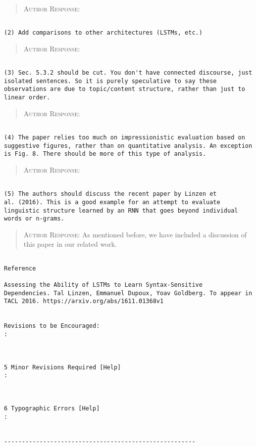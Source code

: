 \begin{quote}
\textsc{Author Response:}  
\end{quote}
\begin{verbatim}

(2) Add comparisons to other architectures (LSTMs, etc.)
\end{verbatim}  
\begin{quote}
\textsc{Author Response:}  
\end{quote}
\begin{verbatim}

(3) Sec. 5.3.2 should be cut. You don't have connected discourse, just
isolated sentences. So it is purely speculative to say these
observations are due to topic/content structure, rather than just to
linear order.
\end{verbatim}  
\begin{quote}
\textsc{Author Response:}  
\end{quote}
\begin{verbatim}

(4) The paper relies too much on impressionistic evaluation based on
suggestive figures, rather than on quantitative analysis. An exception
is Fig. 8. There should be more of this type of analysis.
\end{verbatim}  
\begin{quote}
\textsc{Author Response:}  
\end{quote}
\begin{verbatim}

(5) The authors should discuss the recent paper by Linzen et
al. (2016). This is a good example for an attempt to evaluate
linguistic structure learned by an RNN that goes beyond individual
words or n-grams.
\end{verbatim}  
\begin{quote}
\textsc{Author Response:}  As mentioned before, we have included a discussion of
this paper in our related work.
\end{quote}
\begin{verbatim}

Reference

Assessing the Ability of LSTMs to Learn Syntax-Sensitive
Dependencies. Tal Linzen, Emmanuel Dupoux, Yoav Goldberg. To appear in
TACL 2016. https://arxiv.org/abs/1611.01368v1


Revisions to be Encouraged:
: 



5 Minor Revisions Required [Help]
: 



6 Typographic Errors [Help]
: 


------------------------------------------------------
\end{verbatim}
